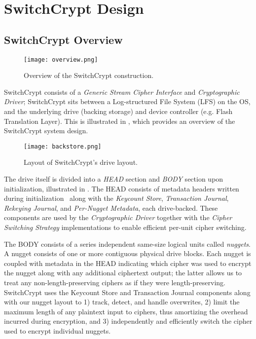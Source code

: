 \section{SwitchCrypt Design} \label{sec:design}

\subsection{SwitchCrypt Overview} \label{subsec:overview}

\begin{figure}[ht]
   \centering
   \texttt{[image: overview.png]}
   \caption{Overview of the SwitchCrypt construction.} \label{fig:overview}
\end{figure}

SwitchCrypt consists of a \emph{Generic Stream Cipher Interface} and
\emph{Cryptographic Driver}; SwitchCrypt sits between a Log-structured File
System (LFS) on the OS, and the underlying drive (backing storage) and device
controller (e.g. Flash Translation Layer). This is illustrated in
, which provides an overview of the SwitchCrypt system design.

\begin{figure}[t]
   \centering
   \texttt{[image: backstore.png]}
   \caption{Layout of SwitchCrypt's drive layout.} \label{fig:backstore}
\end{figure}

The drive itself is divided into a \emph{HEAD} section and \emph{BODY} section
upon initialization, illustrated in . The HEAD consists of
metadata headers written during initialization~\cite{StrongBox} along with the
\emph{Keycount Store}, \emph{Transaction Journal}, \emph{Rekeying Journal}, and
\emph{Per-Nugget Metadata}, each drive-backed. These components are used by the
\emph{Cryptographic Driver} together with the \emph{Cipher Switching Strategy}
implementations to enable efficient per-unit cipher switching.

The BODY consists of a series independent same-size logical units called
\emph{nuggets}. A nugget consists of one or more contiguous physical drive
blocks. Each nugget is coupled with metadata in the HEAD indicating which cipher
was used to encrypt the nugget along with any additional ciphertext output; the
latter allows us to treat any non-length-preserving ciphers as if they were
length-preserving. SwitchCrypt uses the Keycount Store and Transaction Journal
components along with our nugget layout to 1) track, detect, and handle
overwrites, 2) limit the maximum length of any plaintext input to ciphers, thus
amortizing the overhead incurred during encryption, and 3) independently and
efficiently switch the cipher used to encrypt individual nuggets.

